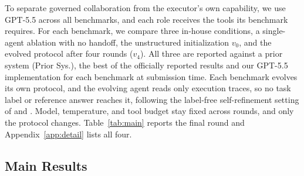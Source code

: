\documentclass{article} %
\begin{document}
To separate governed collaboration from the executor's own capability, we use GPT-5.5 across all benchmarks, and each role receives the tools its benchmark requires. For each benchmark, we compare three in-house conditions, a single-agent ablation with no handoff, the unstructured initialization $v_0$, and the evolved protocol after four rounds ($v_4$). All three are reported against a prior system (Prior Sys.), the best of the officially reported results and our GPT-5.5 implementation for each benchmark at submission time. Each benchmark evolves its own protocol, and the evolving agent reads only execution traces, so no task label or reference answer reaches it, following the label-free self-refinement setting of \citet{shinn2023reflexion} and \citet{madaan2023selfrefine}. Model, temperature, and tool budget stay fixed across rounds, and only the protocol changes. Table~\ref{tab:main} reports the final round and Appendix~\ref{app:detail} lists all four.

\subsection{Main Results}
\label{sec:main_results}
\end{document}
